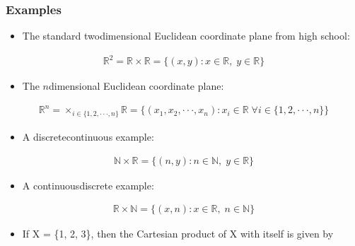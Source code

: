 \documentclass[letterpaper,10pt,english]{jupyterBook}
\begin{document}
\subsubsection{Examples}
\label{\detokenize{02.sets_numbers_coordinates_distances:examples}}\begin{itemize}
\item {} 
\sphinxAtStartPar
The standard two\sphinxhyphen{}dimensional Euclidean coordinate plane from high school:

\end{itemize}
\begin{equation*}
\begin{split}\mathbb{R}^2 = \mathbb{R} \times \mathbb{R} = \{(x, y) : x \in \mathbb{R}, \; y \in \mathbb{R}\}\end{split}
\end{equation*}\begin{itemize}
\item {} 
\sphinxAtStartPar
The \(n\)\sphinxhyphen{}dimensional Euclidean coordinate plane:

\end{itemize}
\begin{equation*}
\begin{split}\mathbb{R}^n = \times_{i \in \{1,2,··· ,n\}} \mathbb{R} = \{(x_1, x_2, · · · , x_n) : x_i \in \mathbb{R} \; \forall i \in \{1, 2, · · · , n\}\}\end{split}
\end{equation*}\begin{itemize}
\item {} 
\sphinxAtStartPar
A discrete\sphinxhyphen{}continuous example:

\end{itemize}
\begin{equation*}
\begin{split}\mathbb{N} \times \mathbb{R} = \{(n, y) : n \in \mathbb{N}, \; y \in \mathbb{R}\}\end{split}
\end{equation*}\begin{itemize}
\item {} 
\sphinxAtStartPar
A continuous\sphinxhyphen{}discrete example:

\end{itemize}
\begin{equation*}
\begin{split}\mathbb{R} \times \mathbb{N} = \{(x, n) : x \in \mathbb{R}, \; n \in \mathbb{N}\}\end{split}
\end{equation*}\begin{itemize}
\item {} 
\sphinxAtStartPar
If X = \{1, 2, 3\}, then the Cartesian product of X with itself is given by

\end{itemize}
\end{document}
